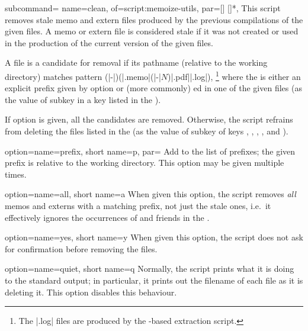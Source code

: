\documentclass[a4paper,11pt]{article}
\begin{document}
\begin{doc}{
    subcommand={
      name=clean,
      of=script:memoize-utils,
      par={[] []*},
    }
  }
  This script removes stale memo and extern files produced by the previous
  compilations of the given  files.  A memo or extern file is
  considered stale if it was not created or used in the production of the
  current version of the given  files.

  A file is a candidate for removal if its pathname (relative to the working
  directory) matches pattern
  (|-|)(|.memo|\alt(|-|$N$)|.pdf|\alt|.log|),%
  \footnote{The |.log| files are produced by the -based extraction
    script.} where the  is either an explicit prefix given by
  option  or (more commonly)
  ed in one of the given  files (as the value of
   subkey in a  key listed in the
  ).

  If option  is given, all the
  candidates are removed.  Otherwise, the script refrains from deleting the
  files listed in the  (as the value of
   subkey of keys ,
  , , ,
   and ).

  \begin{doc}{
      option={name=prefix, short name=p, par=}
    }
    Add  to the list of prefixes; the given prefix is
    relative to the working directory.  This option may be given multiple
    times.
  \end{doc}
  \begin{doc}{
      option={name=all, short name=a}
    }
    When given this option, the script removes \emph{all} memos and externs
    with a matching prefix, not just the stale ones, i.e.\ it effectively
    ignores the occurrences of  and friends in the
    .
  \end{doc}
  \begin{doc}{
      option={name=yes, short name=y}
    }
    When given this option, the script does not ask for confirmation before
    removing the files.
  \end{doc}
  \begin{doc}{
      option={name=quiet, short name=q}
    }
    Normally, the script prints what it is doing to the standard output; in
    particular, it prints out the filename of each file as it is deleting it.
    This option disables this behaviour.
  \end{doc}
\end{doc}
\end{document}
